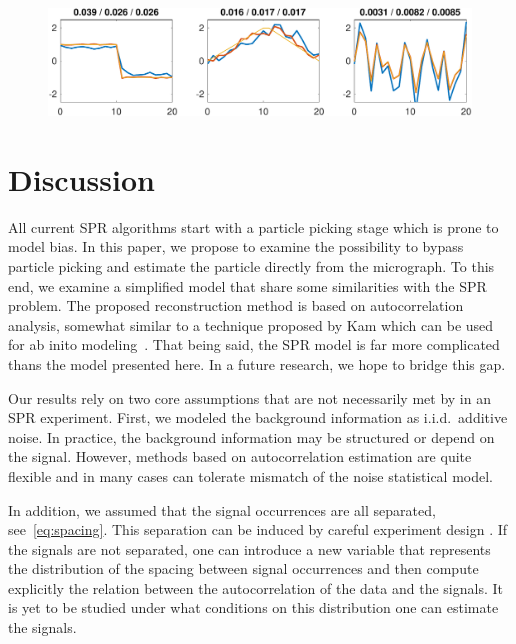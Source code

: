 \documentclass[english,11pt]{article}
\newcommand{\TODO}[1]{{\color{red}{[#1]}}}
\numberwithin{equation}{section}
\theoremstyle{plain}
\theoremstyle{definition}
\theoremstyle{remark}
\theoremstyle{plain}
\theoremstyle{remark}
\theoremstyle{plain}
\theoremstyle{plain}
\begin{document}
\begin{figure}[t]
	\centering
	\includegraphics[width=0.9\linewidth]{XP_1D_heterogeneous/data_example_heterogeneous_n_24600000000_604392_fig1}
	\caption{\TODO{Thin yellow is ground truth; blue is ROI of first optimization; red is final estimation. Relative error for blue is .37, and .13 for red. Individual relative errors of the red estimates: 0.0239393 / 0.208925 / 0.0335956}}
	\label{fig:1Dheterosignals}
\end{figure}



\section{Discussion}

All current SPR algorithms start with a particle picking stage which is prone to model bias. 
In this paper, we propose to examine the possibility to bypass particle picking and estimate the particle directly from the micrograph. To this end, we examine a simplified model that share some similarities with the SPR problem. The proposed reconstruction method is based on autocorrelation analysis, 
somewhat similar to a technique proposed by Kam which can be used for ab inito modeling~\cite{kam1980reconstruction,levin20173d,singer2018mathematics}. 
That being said, the SPR model is far more complicated thans the model presented here. In a future research, we hope to bridge this gap.

Our results rely on two core assumptions that are not necessarily met by in an SPR experiment.  
First, we modeled the background information as i.i.d.\ additive noise. In practice, the background information may be structured or depend on the signal. However, methods based on autocorrelation estimation are quite flexible and in many cases can tolerate mismatch of the noise statistical model.

In addition, we assumed that the signal occurrences are all separated, see~\eqref{eq:spacing}. 
This separation can be induced by careful experiment design \TODO{???}. 
If the signals are not separated, one can introduce a new variable that represents the distribution of the spacing between signal occurrences and then compute explicitly the relation between the autocorrelation of the data and the signals. It is yet to be studied under what conditions on this distribution one can estimate the signals. 
\end{document}
